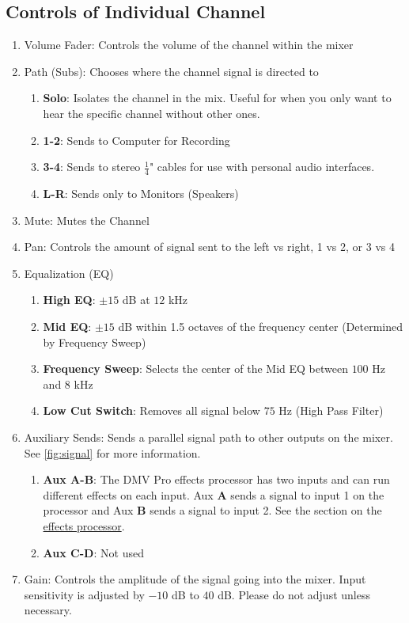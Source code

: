 \documentclass{tufte-book} %
\begin{document}
\subsection{Controls of Individual Channel}

\begin{enumerate}
	\item Volume Fader: Controls the volume of the channel within the mixer
	\item Path (Subs): Chooses where the channel signal is directed to
	\begin{enumerate}
		\item \textbf{Solo}: Isolates the channel in the mix. Useful for when you only want to hear the specific channel without other ones. 
		\item \textbf{1-2}: Sends to Computer for Recording
		\item \textbf{3-4}: Sends to stereo $\frac{1}{4}$" cables for use with personal audio interfaces. 
		\item \textbf{L-R}: Sends only to Monitors (Speakers)
	\end{enumerate}
	\item Mute: Mutes the Channel 
	\item Pan: Controls the amount of signal sent to the left vs right, 1 vs 2, or 3 vs 4
	\item Equalization (EQ) 
	\begin{enumerate}
		\item \textbf{High EQ}: $\pm 15$ dB at $12$ kHz
		\item \textbf{Mid EQ}: $\pm 15$ dB within 1.5 octaves of the frequency center (Determined by Frequency Sweep) 
		\item \textbf{Frequency Sweep}: Selects the center of the Mid EQ between $100$ Hz and $8$ kHz 
		\item \textbf{Low Cut Switch}: Removes all signal below $75$ Hz (High Pass Filter) 
	\end{enumerate}
	\item Auxiliary Sends: Sends a parallel signal path to other outputs on the mixer. See \ref{fig:signal} for more information. 
	\begin{enumerate}
		\item \textbf{Aux A-B}: The DMV Pro effects processor has two inputs and can run different effects on each input. Aux \textbf{A} sends a signal to input 1 on the processor and Aux \textbf{B} sends a signal to input 2. See the section on the \hyperlink{effects processor}{effects processor}. 
		\item \textbf{Aux C-D}: Not used 
	\end{enumerate}
	\item Gain: Controls the amplitude of the signal going into the mixer. Input sensitivity is adjusted by $-10$ dB to $40$ dB. Please do not adjust unless necessary. 
\end{enumerate}
\end{document}
